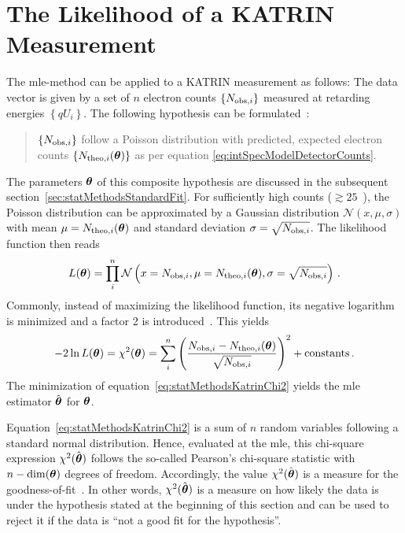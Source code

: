 \section{The Likelihood of a KATRIN Measurement}
\label{sec:statMethodsKATRINLikelihood}
The \gls{mle}-method can be applied to a KATRIN measurement as follows: The data vector is given by a set of $n$ electron counts $\left\{N_{\mathrm{obs,}i}\right\}$ measured at retarding energies $\left\{qU_i\right\}$. The following hypothesis can be formulated~\cite{Kleesiek2014}:
\begin{quote}
	$\left\{N_{\mathrm{obs,}i}\right\}$ follow a Poisson distribution with predicted, expected electron counts $\left\{N_{\mathrm{theo,}i}(\boldsymbol{\mathbf{\theta}})\right\}$ as per equation \eqref{eq:intSpecModelDetectorCounts}.
\end{quote}
The parameters $\boldsymbol{\mathbf{\theta}}$ of this composite hypothesis are discussed in the subsequent section~\ref{sec:statMethodsStandardFit}. For sufficiently high counts ($\gtrsim25$~\cite{Kleesiek2019}), the Poisson distribution can be approximated by a Gaussian distribution $\mathcal{N}(x,\mu, \sigma)$ with mean $\mu=N_{\mathrm{theo,}i}(\boldsymbol{\mathbf{\theta}})$ and standard deviation $\sigma=\sqrt{N_{\mathrm{obs,}i}}$. The likelihood function then reads~\cite{Kleesiek2014}
\begin{equation}
	\label{eq:KATRINlikelihood}
	L(\boldsymbol{\mathbf{\theta}}) = \prod_{i}^{n} \mathcal{N}\left(
		x=N_{\mathrm{obs,}i},
		\mu=N_{\mathrm{theo,}i}(\boldsymbol{\mathbf{\theta}}),
		\sigma=\sqrt{N_{\mathrm{obs,}i}}
	\right)
	\text{\,.}
\end{equation}
Commonly, instead of maximizing the likelihood function, its negative logarithm is minimized and a factor 2 is introduced~\cite{ReviewOfParticlePhysics}. This yields
\begin{equation}
	\label{eq:statMethodsKatrinChi2}
	-2\ln L(\boldsymbol{\mathbf{\theta}}) = \chi^2(\boldsymbol{\mathbf{\theta}}) = \sum_i^n
		\left( 
			\frac{N_{\mathrm{obs,}i}-N_{\mathrm{theo,}i}(\boldsymbol{\mathbf{\theta}})}{\sqrt{N_{\mathrm{obs,}i}}}
		\right)^2
		 + \mathrm{constants}
		\text{\,.}
\end{equation}
The minimization of equation~\eqref{eq:statMethodsKatrinChi2} yields the \gls{mle} estimator $\hat{\boldsymbol{\mathbf{\theta}}}$ for $\boldsymbol{\mathbf{\theta}}$.

Equation~\eqref{eq:statMethodsKatrinChi2} is a sum of $n$ random variables following a standard normal distribution. Hence, evaluated at the \gls{mle}, this chi-square expression $\chi^2(\hat{\boldsymbol{\mathbf{\theta}}})$ follows the so-called Pearson's chi-square statistic with $n-\mathrm{dim}(\boldsymbol{\mathbf{\theta}})$ degrees of freedom. Accordingly, the value $\chi^2(\hat{\boldsymbol{\mathbf{\theta}}})$ is a measure for the goodness-of-fit~\cite{ReviewOfParticlePhysics}. In other words, $\chi^2(\hat{\boldsymbol{\mathbf{\theta}}})$ is a measure on how likely the data is under the hypothesis stated at the beginning of this section and can be used to reject it if the data is ``not a good fit for the hypothesis''.

